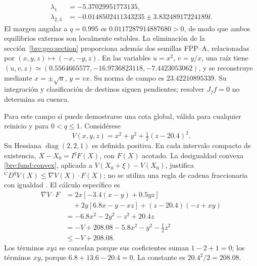 \[
 \begin{aligned}
 \lambda_1&=-5.37029951773135,\\
 \lambda_{2,3}&=-0.0148502411343235
                    \pm3.83248917224189\ii.
 \end{aligned}
\]
El margen angular a \(q=0.995\) es \(0.0117287914887680>0\), de modo que
ambos equilibrios externos son localmente estables.
La eliminación de la sección~\ref{bre:geo:section} proporciona además dos
semillas FPP--A, relacionadas por \((x,y,z)\mapsto(-x,-y,z)\).
En las variables \(u=x^2\), \(v=y/x\), una raíz tiene
\((u,v,z)\simeq(0.5564665577,-16.9736823118,-7.4423053062)\), y se
reconstruye mediante \(x=\pm\sqrt u\), \(y=vx\). Su norma de campo es
\(23.42210895339\). Su integración y clasificación de destinos siguen
pendientes; resolver \(J_ff=0\) no determina su cuenca.

Para este campo sí puede demostrarse una cota global, válida para cualquier
reinicio y para \(0<q\leq1\). Considérese
\begin{equation}
 V(x,y,z)=x^2+y^2+\tfrac12(z-20.4)^2.
 \label{bre:res:lorenz-V}
\end{equation}
Su Hessiana \(\operatorname{diag}(2,2,1)\) es definida positiva. En cada
intervalo compacto de existencia, \(X-X_0=I^qF(X)\), con \(F(X)\)
acotado. La desigualdad convexa \eqref{bre:fund:convex}, aplicada a
\(V(X_0+\xi)-V(X_0)\), justifica
\({}^{\mathrm C}D^q V(X)\leq\nabla V(X)\cdot F(X)\); no se utiliza una
regla de cadena fraccionaria con igualdad
\cite{Gomoyunov2018Convex}. El cálculo específico es
\begin{align*}
 \nabla V\cdot F
 & =2x[-3.4(x-y)+0.5yz]\\
 &\quad+2y[6.8x-y-xz]+(z-20.4)(-z+xy)\\
 &=-6.8x^2-2y^2-z^2+20.4z\\
 &=-V+208.08-5.8x^2-y^2-\tfrac12z^2\\
 &\leq -V+208.08.
\end{align*}
Los términos \(xyz\) se cancelan porque sus coeficientes suman
\(1-2+1=0\); los términos \(xy\), porque
\(6.8+13.6-20.4=0\). La constante es
\(20.4^2/2=208.08\).

